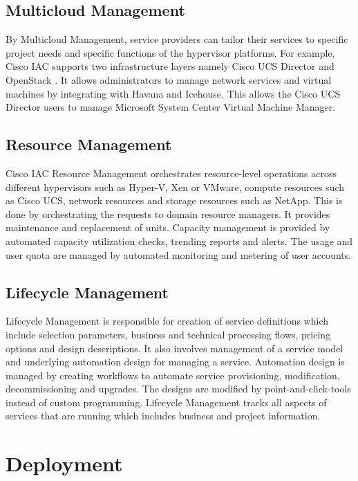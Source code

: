 \documentclass[9pt,twocolumn,twoside]{../../styles/osajnl}
\begin{document}
\subsection{Multicloud Management}

By Multicloud Management, service providers can tailor their services
to specific project needs and specific functions of the hypervisor
platforms. For example, Cisco IAC supports two infrastructure layers
namely Cisco UCS Director and OpenStack \cite{cisco-mondora}. It
allows administrators to manage network services and virtual machines
by integrating with Havana and Icehouse. This allows the Cisco UCS
Director users to manage Microsoft System Center Virtual Machine
Manager.

\subsection{Resource Management}

Cisco IAC Resource Management orchestrates resource-level operations
across different hypervisors such as Hyper-V, Xen or VMware, compute
resources such as Cisco UCS, network resources and storage resources
such as NetApp. This is done by orchestrating the requests to domain
resource managers. It provides maintenance and replacement of
units. Capacity management is provided by automated capacity
utilization checks, trending reports and alerts. The usage and user
quota are managed by automated monitoring and metering of user
accounts.

\subsection{Lifecycle Management}

Lifecycle Management is responsible for creation of service
definitions which include selection parameters, business and technical
processing flows, pricing options and design descriptions. It also
involves management of a service model and underlying automation
design for managing a service. Automation design is managed by
creating workflows to automate service provisioning, modification,
decommissioning and upgrades. The designs are modified by
point-and-click-tools instead of custom programming. Lifecycle
Management tracks all aspects of services that are running which
includes business and project information.

\section{Deployment}
\end{document}
